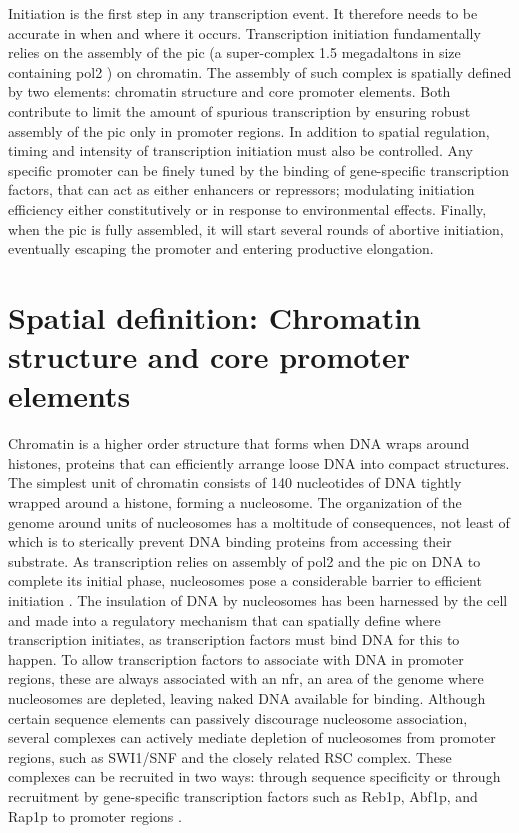 Initiation is the first step in any transcription event. 
It therefore needs to be accurate in when and where it occurs. 
Transcription initiation fundamentally relies on the assembly of the \gls{pic} (a super-complex 1.5 megadaltons in size  containing \gls{pol2} \cite{fazal:2015:realtime}) on chromatin.
The assembly of such complex is spatially defined by two elements: chromatin structure and core promoter elements.
Both contribute to limit the amount of spurious transcription by ensuring robust assembly of the \gls{pic} only in promoter regions.
In addition to spatial regulation, timing and intensity of transcription initiation must also be controlled.
Any specific promoter can be finely tuned by the binding of gene-specific transcription factors, that can act as either enhancers or repressors; modulating initiation efficiency either constitutively or in response to environmental effects. 
Finally, when the \gls{pic} is fully assembled, it will start several rounds of abortive initiation, eventually escaping the promoter and entering productive elongation.

\section{Spatial definition: Chromatin structure and core promoter elements}

Chromatin is a higher order structure that forms when DNA wraps around histones, proteins that can efficiently arrange loose DNA into compact structures.
The simplest unit of chromatin consists of 140 nucleotides of DNA tightly wrapped around a histone, forming a nucleosome.
The organization of the genome around units of nucleosomes has a moltitude of consequences, not least of which is to sterically prevent DNA binding proteins from accessing their substrate. 
As transcription relies on assembly of \gls{pol2} and the \gls{pic} on DNA to complete its initial phase, nucleosomes pose a considerable barrier to efficient initiation \cite{field:2008:distinct} \cite{jiang:2009:compiled}.
The insulation of DNA by nucleosomes has been harnessed by the cell and made into a regulatory mechanism that can spatially define where transcription initiates, as transcription factors must bind DNA for this to happen. 
To allow transcription factors to associate with DNA in promoter regions, these are always associated with an \gls{nfr}, an area of the genome where nucleosomes are depleted, leaving naked DNA available for binding.
Although certain sequence elements can passively discourage nucleosome association, several complexes can actively mediate depletion of nucleosomes from promoter regions, such as SWI1/SNF and the closely related RSC complex.
These complexes can be recruited in two ways: through sequence specificity \cite{badis:2008:library, kubik:2015:two}or through recruitment by gene-specific transcription factors such as Reb1p, Abf1p, and Rap1p to promoter regions \citep{floer:2010:rscnucleosome, hartley:2009:mechanisms, spain:2014:rsc, badis:2008:library}.

